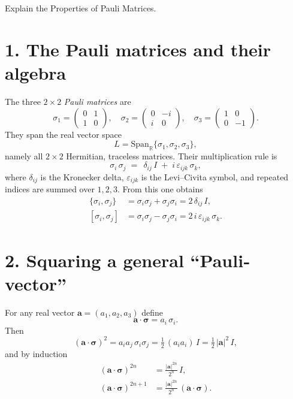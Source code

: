 \documentclass[a4paper,12pt]{report}
\begin{document}

{Explain the Properties of Pauli Matrices.}
{\section*{1. The Pauli matrices and their algebra}

The three $2\times2$ \emph{Pauli matrices} are
\begin{equation}
\sigma_1 = \begin{pmatrix}0 & 1\\[4pt]1 & 0\end{pmatrix}, 
\quad
\sigma_2 = \begin{pmatrix}0 & -i\\[4pt]i & 0\end{pmatrix},
\quad
\sigma_3 = \begin{pmatrix}1 & 0\\[4pt]0 & -1\end{pmatrix}.
\end{equation}
They span the real vector space
\begin{equation}
L = \mathrm{Span}_{\mathbb R}\{\sigma_1,\sigma_2,\sigma_3\},
\end{equation}
namely all $2\times2$ Hermitian, traceless matrices. Their multiplication rule is
\begin{equation}
\sigma_i\,\sigma_j \;=\;\,\delta_{ij}\,I \;+\; i\,\varepsilon_{ijk}\,\sigma_k,
\end{equation}
where $\delta_{ij}$ is the Kronecker delta, $\varepsilon_{ijk}$ is the Levi–Civita symbol, and repeated indices are summed over $1,2,3$. From this one obtains
\begin{align}
\{\sigma_i,\sigma_j\} &= \sigma_i\sigma_j + \sigma_j\sigma_i = 2\,\delta_{ij}\,I,\\
[\sigma_i,\sigma_j]  &= \sigma_i\sigma_j - \sigma_j\sigma_i = 2\,i\,\varepsilon_{ijk}\,\sigma_k.
\end{align}

\section*{2. Squaring a general “Pauli‐vector”}

For any real vector $\bm a=(a_1,a_2,a_3)$ define
\begin{equation}
\bm a\cdot\bm\sigma = a_i\,\sigma_i.
\end{equation}
Then
\begin{equation}
(\bm a\cdot\bm\sigma)^2
= a_i a_j\,\sigma_i\sigma_j
= \tfrac12\,(a_i a_i)\,I
= \tfrac12\,|\bm a|^2\,I,
\end{equation}
and by induction
\begin{align}
(\bm a\cdot\bm\sigma)^{2n} &= \frac{|\bm a|^{2n}}{2^n}\,I,\\
(\bm a\cdot\bm\sigma)^{2n+1} &= \frac{|\bm a|^{2n}}{2^n}\,(\bm a\cdot\bm\sigma).
\end{align}

}
\end{document}
